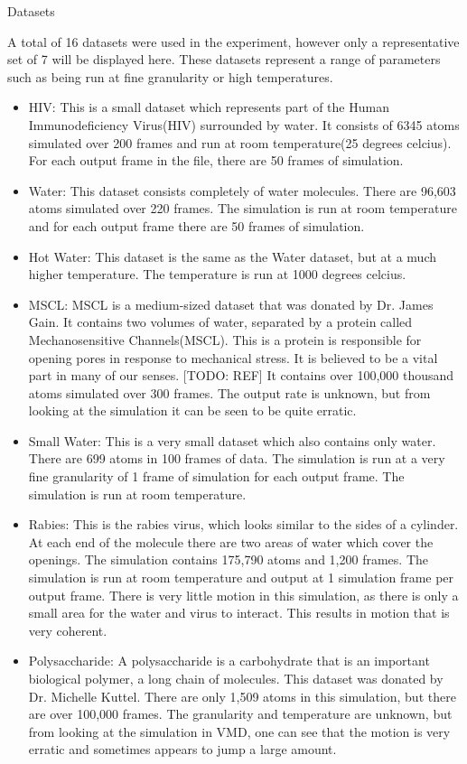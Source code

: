 \documentclass[a4paper,11pt]{report}
\begin{document}
\begin{section}{Datasets}

A total of 16 datasets were used in the experiment, however only a representative set of 7 will be displayed here. These datasets represent a range of parameters such as being run at fine granularity or high temperatures. 

\begin{itemize}
 \item HIV: This is a small dataset which represents part of the Human Immunodeficiency Virus(HIV) surrounded by water. It consists of 6345 atoms simulated over 200 frames and run at room temperature(25 degrees celcius). For each output frame in the file, there are 50 frames of simulation.
 \item Water: This dataset consists completely of water molecules. There are 96,603 atoms simulated over 220 frames. The simulation is run at room temperature and for each output frame there are 50 frames of simulation.  
 \item Hot Water: This dataset is the same as the Water dataset, but at a much higher temperature. The temperature is run at 1000 degrees celcius.
 \item MSCL: MSCL is a medium-sized dataset that was donated by Dr. James Gain. It contains two volumes of water, separated by a protein called Mechanosensitive Channels(MSCL). This is a protein is responsible for opening pores in response to mechanical stress. It is believed to be a vital part in many of our senses. [TODO: REF] It contains over 100,000 thousand atoms simulated over 300 frames. The output rate is unknown, but from looking at the simulation it can be seen to be quite erratic.
 \item Small Water: This is a very small dataset which also contains only water. There are 699 atoms in 100 frames of data. The simulation is run at a very fine granularity of 1 frame of simulation for each output frame. The simulation is run at room temperature.
 \item Rabies: This is the rabies virus, which looks similar to the sides of a cylinder. At each end of the molecule there are two areas of water which cover the openings. The simulation contains 175,790 atoms and 1,200 frames. The simulation is run at room temperature and output at 1 simulation frame per output frame. There is very little motion in this simulation, as there is only a small area for the water and virus to interact. This results in motion that is very coherent.
 \item Polysaccharide: A polysaccharide is a carbohydrate that is an important biological polymer, a long chain of molecules. This dataset was donated by Dr. Michelle Kuttel. There are only 1,509 atoms in this simulation, but there are over 100,000 frames. The granularity and temperature are unknown, but from looking at the simulation in VMD, one can see that the motion is very erratic and sometimes appears to jump a large amount.
\end{itemize}


\end{section}
\end{document}
